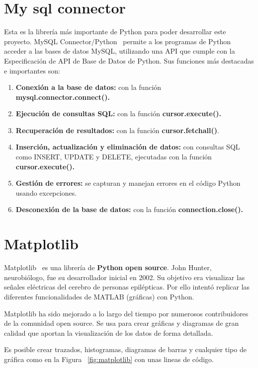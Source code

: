 \documentclass[a4paper, 12pt]{book}
\begin{document}
\section{My sql connector} 
\label{sec:mysqlconnector}
Esta es la librería más importante de Python para poder desarrollar este proyecto.
MySQL Connector/Python~\cite{mysql:_connectors} permite a los programas de Python acceder a las bases de datos MySQL, utilizando una API que cumple con la Especificación de API de Base de Datos de Python.
Sus funciones más destacadas e importantes son:
\begin{enumerate}
	\item \textbf{Conexión a la base de datos: }con la función \textbf{mysql.connector.connect().}
	\item \textbf{Ejecución de consultas SQL: }con la función \textbf{cursor.execute().}
	\item \textbf{Recuperación de resultados: }con la función \textbf{cursor.fetchall()}.
	\item \textbf{Inserción, actualización y eliminación de datos: }con consultas SQL como INSERT, UPDATE y DELETE, ejecutadas con la función \textbf{cursor.execute().}
	\item \textbf{Gestión de errores: }se capturan y manejan errores en el código Python usando excepciones.
	\item \textbf{Desconexión de la base de datos: }con la función \textbf{connection.close().}
\end{enumerate}

\section{Matplotlib} 
\label{sec:matplotlib}


Matplotlib~\cite{python:_matplotlib} es una librería de \textbf{Python open source}. John Hunter, neurobiólogo, fue su desarrollador inicial en 2002. Su objetivo era visualizar las señales eléctricas del cerebro de personas epilépticas. Por ello intentó replicar las diferentes funcionalidades de MATLAB (gráficas) con Python. 

Matplotlib ha sido mejorado a lo largo del tiempo por numerosos contribuidores de la comunidad open source. Se usa para crear gráficas y diagramas de gran calidad que aportan la visualización de los datos de  forma detallada.

Es posible crear trazados, histogramas, diagramas de barras y cualquier tipo de gráfica como en la Figura ~\ref{fig:matplotlib} con unas lineas de código.
\end{document}
